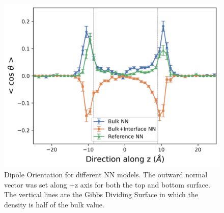 \begin{figure}[tbhp!]
	\centering
	\includegraphics[width=0.75\linewidth]{images/dipole_dist_new.png}
	\caption{Dipole Orientation for different NN models. The outward normal
		vector was set along +z axis for both the top and bottom
		surface. The vertical
		lines
		are
		the Gibbs Dividing Surface in which the density is half of the
		bulk value.
	}\label{fig:dipole_orient}
\end{figure}


\clearpage
